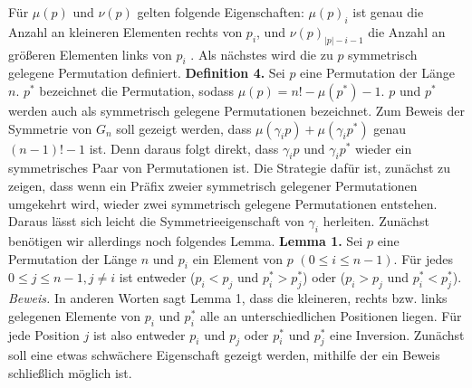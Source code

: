 \documentclass[a4paper, 11pt, ngerman]{article}
\begin{document}
\newline \newline
Für $\mu(p)$ und $\nu(p)$ gelten folgende Eigenschaften: $\mu(p)_i$ ist genau die Anzahl an kleineren Elementen rechts von $p_i$, und $\nu(p)_{|p| - i - 1}$ die Anzahl an größeren Elementen links von $p_i$ \cite{factorial}. Als nächstes wird die zu $p$ symmetrisch gelegene Permutation definiert.
\newline \newline
\textbf{Definition 4.} Sei $p$ eine Permutation der Länge $n$. $p^*$ bezeichnet die Permutation, sodass $\mu(p) = n! - \mu(p^*) - 1$. $p$ und $p^*$ werden auch als symmetrisch gelegene Permutationen bezeichnet.
\newline \newline
Zum Beweis der Symmetrie von $G_n$ soll gezeigt werden, dass $\mu(\gamma_i p) + \mu(\gamma_i p^*)$ genau $(n - 1)! - 1$ ist. Denn daraus folgt direkt, dass $\gamma_i p$ und $\gamma_i p^*$ wieder ein symmetrisches Paar von Permutationen ist. Die Strategie dafür ist, zunächst zu zeigen, dass wenn ein Präfix zweier symmetrisch gelegener Permutationen umgekehrt wird, wieder zwei symmetrisch gelegene Permutationen entstehen. Daraus lässt sich leicht die Symmetrieeigenschaft von $\gamma_i$ herleiten. Zunächst benötigen wir allerdings noch folgendes Lemma.
\newline \newline
\textbf{Lemma 1.} Sei $p$ eine Permutation der Länge $n$ und $p_i$ ein Element von $p$ $(0 \le i \le n - 1)$. Für jedes $0 \le j \le n-1, j \ne i$ ist entweder ($p_i < p_j$ und $p^*_i > p^*_j$) oder ($p_i > p_j$ und $p^*_i < p^*_j$).
\newline \newline
\emph{Beweis.} In anderen Worten sagt Lemma 1, dass die kleineren, rechts bzw. links gelegenen Elemente von $p_i$ und $p^*_i$ alle an unterschiedlichen Positionen liegen. Für jede Position $j$ ist also entweder $p_i$ und $p_j$ oder $p^*_i$ und $p^*_j$ eine Inversion. Zunächst soll eine etwas schwächere Eigenschaft gezeigt werden, mithilfe der ein Beweis schließlich möglich ist.
\end{document}
